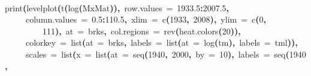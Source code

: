 \documentclass[a4paper]{article}
\newcommand{\hlnumber}[1]{\textcolor[rgb]{0.0823529411764706,0.0784313725490196,0.709803921568627}{#1}}%
\newcommand{\hlfunctioncall}[1]{\textcolor[rgb]{1,0,0}{#1}}%
\newcommand{\hlkeyword}[1]{\textcolor[rgb]{0,0,0}{\textbf{#1}}}%
\newcommand{\hlargument}[1]{\textcolor[rgb]{0.694117647058824,0.247058823529412,0.0196078431372549}{#1}}%
\newcommand{\hlsymbol}[1]{\textcolor[rgb]{0,0,0}{#1}}%
\newcommand{\hlprompt}[1]{\textcolor[rgb]{0,0,0}{#1}}%
\newcommand{\hlstd}[1]{\textcolor[rgb]{0,0,0}{#1}}%
\newenvironment{Houtput}{\raggedright}{%
%
}
\begin{document}
\begin{Houtput}
\normalfont
\hspace*{\fill}\\
\hlstd{}\ttfamily\noindent
\hlprompt{\usebox{\hlnormalsizeboxgreaterthan}{\ }}\hlfunctioncall{print}\hlkeyword{(}\hlfunctioncall{levelplot}\hlkeyword{(}\hlfunctioncall{t}\hlkeyword{(}\hlfunctioncall{log}\hlkeyword{(}\hlsymbol{MxMat}\hlkeyword{)}\hlkeyword{)}\hlkeyword{,}{\ }\hlargument{row.values}{\ }\hlargument{=}{\ }\hlnumber{1933.5}\hlkeyword{:}\hlnumber{2007.5}\hlkeyword{,}\hspace*{\fill}\\
\hlstd{}\hlprompt{{\ }}{\ }{\ }{\ }{\ }\hlargument{column.values}{\ }\hlargument{=}{\ }\hlnumber{0.5}\hlkeyword{:}\hlnumber{110.5}\hlkeyword{,}{\ }\hlargument{xlim}{\ }\hlargument{=}{\ }\hlfunctioncall{c}\hlkeyword{(}\hlnumber{1933}\hlkeyword{,}{\ }\hlnumber{2008}\hlkeyword{)}\hlkeyword{,}{\ }\hlargument{ylim}{\ }\hlargument{=}{\ }\hlfunctioncall{c}\hlkeyword{(}\hlnumber{0}\hlkeyword{,}\hspace*{\fill}\\
\hlstd{}\hlprompt{{\ }}{\ }{\ }{\ }{\ }{\ }{\ }{\ }{\ }\hlnumber{111}\hlkeyword{)}\hlkeyword{,}{\ }\hlargument{at}{\ }\hlargument{=}{\ }\hlsymbol{brks}\hlkeyword{,}{\ }\hlargument{col.regions}{\ }\hlargument{=}{\ }\hlfunctioncall{rev}\hlkeyword{(}\hlfunctioncall{heat.colors}\hlkeyword{(}\hlnumber{20}\hlkeyword{)}\hlkeyword{)}\hlkeyword{,}\hspace*{\fill}\\
\hlstd{}\hlprompt{{\ }}{\ }{\ }{\ }{\ }\hlargument{colorkey}{\ }\hlargument{=}{\ }\hlfunctioncall{list}\hlkeyword{(}\hlargument{at}{\ }\hlargument{=}{\ }\hlsymbol{brks}\hlkeyword{,}{\ }\hlargument{labels}{\ }\hlargument{=}{\ }\hlfunctioncall{list}\hlkeyword{(}\hlargument{at}{\ }\hlargument{=}{\ }\hlfunctioncall{log}\hlkeyword{(}\hlsymbol{tm}\hlkeyword{)}\hlkeyword{,}{\ }\hlargument{labels}{\ }\hlargument{=}{\ }\hlsymbol{tml}\hlkeyword{)}\hlkeyword{)}\hlkeyword{,}\hspace*{\fill}\\
\hlstd{}\hlprompt{{\ }}{\ }{\ }{\ }{\ }\hlargument{scales}{\ }\hlargument{=}{\ }\hlfunctioncall{list}\hlkeyword{(}\hlargument{x}{\ }\hlargument{=}{\ }\hlfunctioncall{list}\hlkeyword{(}\hlargument{at}{\ }\hlargument{=}{\ }\hlfunctioncall{seq}\hlkeyword{(}\hlnumber{1940}\hlkeyword{,}{\ }\hlnumber{2000}\hlkeyword{,}{\ }\hlargument{by}{\ }\hlargument{=}{\ }\hlnumber{10}\hlkeyword{)}\hlkeyword{,}{\ }\hlargument{labels}{\ }\hlargument{=}{\ }\hlfunctioncall{seq}\hlkeyword{(}\hlnumber{1940}\hlkeyword{,}\hspace*{\fill}\\

\end{Houtput}
\end{document}
